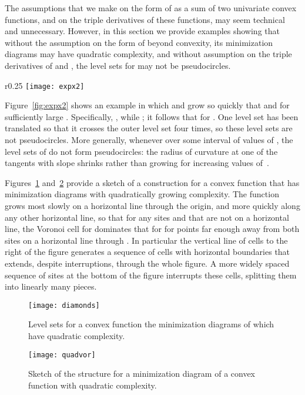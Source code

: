 \documentclass[10pt, conference, compsocconf]{IEEEtran}
\begin{document}
The assumptions that we make on the form of  as a sum of two univariate convex functions, and on the triple derivatives of these functions, may seem technical and unnecessary. However, in this section we provide examples showing that without the assumption on the form of  beyond convexity, its minimization diagrams may have quadratic complexity, and without assumption on the triple derivatives of  and , the level sets for  may not be pseudocircles.

\begin{wrapfigure}{r}{0.25\textwidth}
\centering\texttt{[image: expx2]}
\caption{The level sets for  (shown for function values , , , , , , and ) do not form pseudocircles.}
\label{fig:expx2}
\end{wrapfigure}

Figure~\ref{fig:expx2} shows an example in which  and  grow so quickly that  and  for sufficiently large .
Specifically, , while ; it follows that  for . One level set has been translated so that it crosses the outer level set four times, so these level sets are not pseudo\-circles.
More generally, whenever  over some interval of values of , the level sets of  do not form pseudocircles: the radius of curvature at one of the tangents with slope  shrinks rather than growing for increasing values of~.

Figures~\ref{fig:diamonds} and~\ref{fig:quadvor} provide a sketch of a construction for a convex function that has minimization diagrams with quadratically growing complexity. The function grows most slowly on a horizontal line through the origin, and more quickly along any other horizontal line, so that for any sites  and  that are not on a horizontal line, the Voronoi cell for  dominates that for  for points far enough away from both sites on a horizontal line through . In particular the vertical line of cells to the right of the figure generates a sequence of cells with horizontal boundaries that extends, despite interruptions, through the whole figure. A more widely spaced sequence of sites at the bottom of the figure interrupts these cells, splitting them into linearly many pieces.

\begin{figure}[hb]
\centering\texttt{[image: diamonds]}
\caption{Level sets for a convex function the minimization diagrams of which have quadratic complexity.}
\label{fig:diamonds}
\end{figure}

\begin{figure}[hb]
\centering\texttt{[image: quadvor]}
\caption{Sketch of the structure for a minimization diagram of a convex function with quadratic complexity.}
\label{fig:quadvor}
\end{figure}
\end{document}
